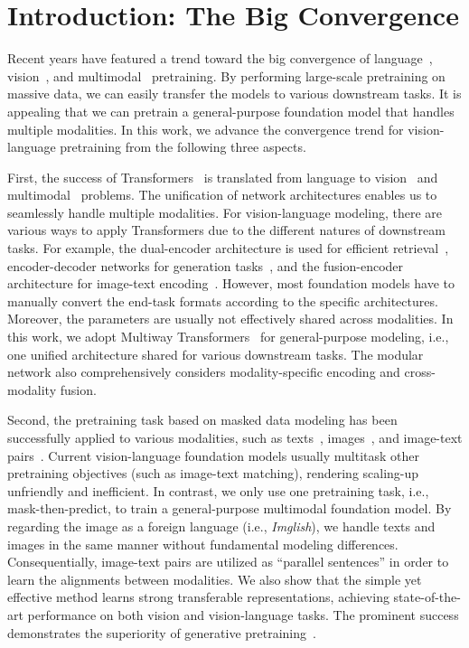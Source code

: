 \documentclass{article}
\newcommand\multiway{Multiway Transformers}
\begin{document}
\section{Introduction: The Big Convergence}
\label{sec:intro}

Recent years have featured a trend toward the big convergence of language~\citep{gpt,bert,unilm}, vision~\citep{beit,beitv2}, and multimodal~\citep{vlmo,clip,coca} pretraining.
By performing large-scale pretraining on massive data, we can easily transfer the models to various downstream tasks.
It is appealing that we can pretrain a general-purpose foundation model that handles multiple modalities.
In this work, we advance the convergence trend for vision-language pretraining from the following three aspects.

First, the success of Transformers~\citep{transformer} is translated from language to vision~\citep{vit} and multimodal~\citep{vilt,vlmo} problems.
The unification of network architectures enables us to seamlessly handle multiple modalities.
For vision-language modeling, there are various ways to apply Transformers due to the different natures of downstream tasks.
For example, the dual-encoder architecture is used for efficient retrieval~\citep{clip}, encoder-decoder networks for generation tasks~\citep{simvlm}, and the fusion-encoder architecture for image-text encoding~\citep{vilt}.
However, most foundation models have to manually convert the end-task formats according to the specific architectures. Moreover, the parameters are usually not effectively shared across modalities.
In this work, we adopt \multiway{}~\citep{vlmo} for general-purpose modeling, i.e., one unified architecture shared for various downstream tasks. The modular network also comprehensively considers modality-specific encoding and cross-modality fusion.

Second, the pretraining task based on masked data modeling has been successfully applied to various modalities, such as texts~\citep{bert}, images~\citep{beit,beitv2}, and image-text pairs~\citep{vlbeit}.
Current vision-language foundation models usually multitask other pretraining objectives (such as image-text matching), rendering scaling-up unfriendly and inefficient.
In contrast, we only use one pretraining task, i.e., mask-then-predict, to train a general-purpose multimodal foundation model.
By regarding the image as a foreign language (i.e., \textit{Imglish}), we handle texts and images in the same manner without fundamental modeling differences.
Consequentially, image-text pairs are utilized as ``parallel sentences'' in order to learn the alignments between modalities.
We also show that the simple yet effective method learns strong transferable representations, achieving state-of-the-art performance on both vision and vision-language tasks.
The prominent success demonstrates the superiority of generative pretraining~\citep{bert,beit}.
\end{document}
